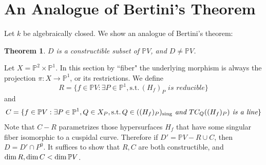 \documentclass[12pt]{article}
\theoremstyle{plain}
\newtheorem{theorem}[equation]{Theorem}
\theoremstyle{definition}
\newcommand{\IP}{\mathbb{P}}
\renewcommand\dim{{\rm dim\,}}
\newcommand{\sing}{{\rm sing}}
\newcommand{\<}{\langle}
\renewcommand{\>}{\rangle}
\newcommand{\st}{\mathrm{s.t.}\,}
\begin{document}
\section{An Analogue of Bertini\rq{}s Theorem}
Let $k$ be algebraically closed. We show an analogue of Bertini's theorem: 
\begin{theorem}
$D$ is a constructible subset of $\IP V$, and $D \neq \IP V$. 
\end{theorem}
Let $X = \IP^2 \times \IP^1$. In this section by ``fiber" the underlying morphism is always the projection $\pi : X \to \IP^1$, or its restrictions. We define 
$$ R = \{ f \in \IP V : \exists P \in \IP^1, \st (H_f)_P \textit{ is reducible} \} $$
and 
$$ C = \{ f \in \IP V : \exists P \in \IP^1, Q \in X_P, \st Q \in ((H_f)_P)_\sing \textit{ and } TC_Q((H_f)_P) \textit{ is a line}\}$$
Note that $C - R$ parametrizes those hypersurfaces $H_f$ that have some singular fiber isomorphic to a cuspidal curve. Therefore if $D' = \IP V - R \cup C$, then $D = D' \cap P^0$. It suffices to show that $R, C$ are both constructible, and $\dim R, \dim C < \dim \IP V$. 
\end{document}
